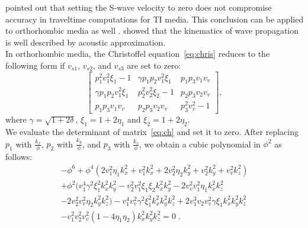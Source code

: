 \cite{alkhalifah1} pointed out that setting the S-wave velocity to zero
does not compromise accuracy in traveltime computations for TI media.
This conclusion can be applied to orthorhombic media as well \cite[]{tsvank}.
\cite{alkaor} showed that the kinematics of wave propagation
is well described by acoustic approximation. 
\\

In orthorhombic media, the Christoffel equation~\ref{eq:chris} reduces to the following form if $v_{s1}$, $v_{s2}$, and $v_{s3}$ are set to zero:
\begin{equation}
  \label{eq:ch}
   \left[\begin{array}{lll}
     p_1^2v_1^2\xi_1-1 & \gamma p_1p_2v_1^2\xi_1 & p_1p_3v_1v_v \\
     \gamma p_1p_2v_1^2\xi_1 & p_2^2v_2^2\xi_2-1 & p_2p_3v_2v_v \\
     p_1p_3v_1v_v & p_2p_3v_2v_v & p_3^2v_v^2-1
          \end{array}\right], 
\end{equation}
where $\gamma=\sqrt{1+2\delta}$, $\xi_1=1+2\eta_1$ and  $\xi_2=1+2\eta_2$.\\

We evaluate the determinant of matrix~\ref{eq:ch} and set it to zero. 
After replacing $p_1$ with $\frac{k_x}{\phi}$,
$p_2$ with $\frac{k_y}{\phi}$, 
and $p_3$ with $\frac{k_z}{\phi}$, 
we obtain a cubic polynomial in $\phi^2$ as follows: 
\begin{equation}
  \label{eq:phi}
   \begin{array}{l}
-\phi ^6+\phi ^4 \left(2 v_1^2 \eta _1 k_x^2+v_1^2 k_x^2+2v_2^2 \eta _2 k_y^2+v_2^2 k_y^2+v_v^2 k_z^2\right)\\
+\phi ^2 (v_1^4 \gamma ^2 \xi_1^2 k_x^2k_y^2-v_2^2 v_1^2 \xi_1 \xi_2
k_x^2 k_y^2-2 v_v^2 v_1^2 \eta _1 k_x^2 k_z^2\\
-2 v_2^2 v_v^2 \eta _2k_y^2 k_z^2)-v_1^4 v_v^2 \gamma ^2 \xi_1^2k_x^2 k_y^2 k_z^2+2 v_1^3 v_2 v_v^2 \gamma \xi_1k_x^2 k_y^2 k_z^2\\
-v_1^2 v_2^2 v_v^2\left(1-4 \eta _1 \eta _2\right) k_x^2 k_y^2 k_z^2=0\;.
\end{array}
\end{equation}

